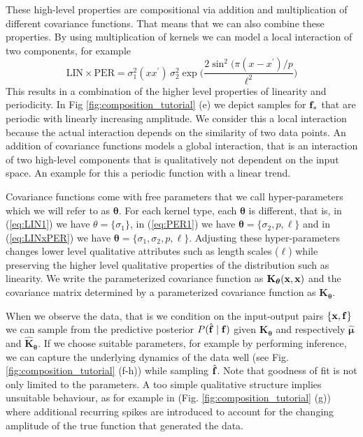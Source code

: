 These high-level properties are compositional via addition and multiplication of different covariance functions. 
That means that we can also combine these properties.
By using multiplication of kernels we can model a local interaction of two components, for example 
\begin{equation}\label{eq:LINxPER}
    \text{LIN} \times \text{PER} =  \sigma_1^2(x x^\prime)\, \sigma_2^2 \exp \bigg( \frac{2 \sin^2 ( \pi (x - x^\prime)/p}{\ell^2} \bigg) 
\end{equation}
This results in a combination of the higher level properties of linearity and  periodicity.
In Fig \ref{fig:composition_tutorial} (e) we depict samples for $\mathbf{f}_*$ that are periodic
with linearly increasing amplitude.
We consider this a local interaction because the actual interaction depends on the similarity
of two data points.
An addition of covariance functions models a global interaction, that is an interaction of two high-level components that is qualitatively not dependent on the input space. An example for this a periodic function with a linear
trend.

Covariance functions come with  free parameters that we call hyper-parameters which we will
refer to as $\bm{\theta}$.
For each kernel type, each $\bm{\theta}$ is different, that is, in (\ref{eq:LIN1}) we have $\theta=\{\sigma_1\}$,
in (\ref{eq:PER1}) we have $\bm{\theta}=\{\sigma_2,p,\ell\}$ and in 
(\ref{eq:LINxPER}) we have $\bm{\theta}=\{\sigma_1,\sigma_2,p,\ell\}$.
Adjusting these hyper-parameters changes lower level qualitative attributes such as length
scales ($\ell$) while preserving the higher level qualitative properties of the distribution
such as linearity.
We write the parameterized covariance function as $\mathbf{K}_{\bm{\theta}}(\mathbf{x},\mathbf{x})$ and the
covariance matrix determined by a parameterized covariance function as $\mathbf{K}_{\bm{\theta}}$.

When we observe the data, that is we condition on the input-output pairs $\{\mathbf{x},\mathbf{f}\}$ we can sample from the 
predictive posterior $P(\hat{\mathbf{f}} \mid \mathbf{f})$ given $\mathbf{K}_{\bm{\theta}}$ and respectively $\bm{\hat{\mu}}$ and $\hat{\mathbf{K}}_{\bm{\theta}}$.
If we choose suitable parameters, for example by performing inference, we can capture the underlying dynamics of the data well (see Fig. \ref{fig:composition_tutorial} (f-h)) while sampling $\hat{\mathbf{f}}$.
Note that goodness of fit is not only limited to the parameters. A too simple qualitative structure
implies unsuitable behaviour, as for example in (Fig. \ref{fig:composition_tutorial} (g)) where additional 
recurring spikes are introduced to account for the changing amplitude of the true function that 
generated the data.





